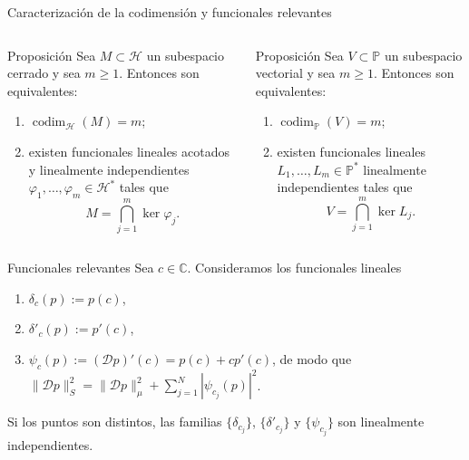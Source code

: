 \documentclass[aspectratio=169,10pt]{beamer}
\newcommand{\C}{\mathbb{C}}
\newcommand{\Poly}{\mathbb{P}}
\newcommand{\D}{\mathcal{D}}
\begin{document}
\begin{frame}{Caracterización de la codimensión y funcionales relevantes}
  \scriptsize
  \begin{columns}[T,onlytextwidth]
    \begin{block}{Proposición}
      Sea \(M\subset\mathcal H\) un subespacio cerrado y sea \(m\geq 1\). Entonces son equivalentes:
      \begin{enumerate}
        \setlength{\itemsep}{0pt}
              \setlength{\parskip}{0pt}
        \item \(\operatorname{codim}_{\mathcal H}(M)=m\);
        \item existen funcionales lineales acotados y linealmente independientes \(\varphi_1,\dots,\varphi_m\in\mathcal H^*\) tales que
              \[
                M=\bigcap_{j=1}^m \ker \varphi_j.
              \]
      \end{enumerate}
    \end{block}

    \begin{block}{Proposición}
      Sea \(V\subset \Poly\) un subespacio vectorial y sea \(m\geq 1\). Entonces son equivalentes:
      \begin{enumerate}
        \setlength{\itemsep}{0pt}
              \setlength{\parskip}{0pt}
        \item \(\operatorname{codim}_{\Poly}(V)=m\);
        \item existen funcionales lineales \(L_1,\dots,L_m\in\Poly^*\) linealmente independientes tales que
              \[
                V=\bigcap_{j=1}^m \ker L_j.
              \]
      \end{enumerate}
    \end{block}
  \end{columns}

  \begin{block}{Funcionales relevantes}
    Sea \(c\in\C\). Consideramos los funcionales lineales
    \begin{enumerate}
      \setlength{\itemsep}{0pt}
            \setlength{\parskip}{0pt}
      \item \(\delta_c(p):=p(c)\),
      \item \(\delta'_c(p):=p'(c)\),
      \item \(\psi_c(p):=(\D p)'(c)=p(c)+cp'(c)\), de modo que \(\|\D p\|_S^2=\|\D p\|_\mu^2+\sum_{j=1}^N |\psi_{c_j}(p)|^2\).
    \end{enumerate}
  \end{block}

  Si los puntos son distintos, las familias \(\{\delta_{c_j}\}\), \(\{\delta'_{c_j}\}\) y \(\{\psi_{c_j}\}\) son linealmente independientes.
\end{frame}
\end{document}
